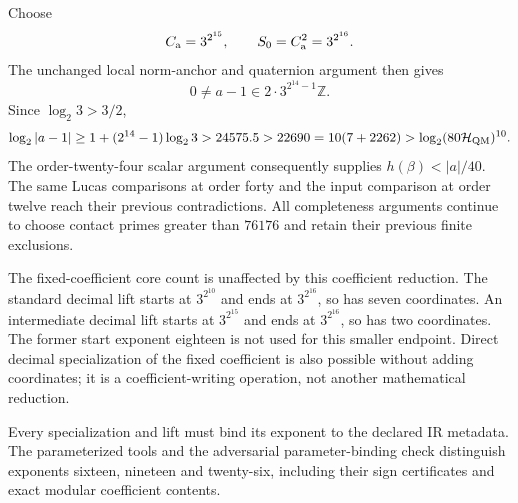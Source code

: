 Choose
\[
 C_{\rm a}=3^{2^{15}},\qquad S_0=C_{\rm a}^2=3^{2^{16}}.
\]
The unchanged local norm-anchor and quaternion argument then gives
\[
 0\ne a-1\in2\cdot3^{2^{14}-1}\mathbb Z.
\]
Since $\log_2 3>3/2$,
\[
 \log_2|a-1|\ge1+(2^{14}-1)\log_2 3
 >24575.5>22690=10(7+2262)
 >\log_2(80\mathcal H_{\rm QM})^{10}.
\]
The order-twenty-four scalar argument consequently supplies
$h(\beta)<|a|/40$. The same Lucas comparisons at order forty and the
input comparison at order twelve reach their previous contradictions.
All completeness arguments continue to choose contact primes greater
than $76176$ and retain their previous finite exclusions.

The fixed-coefficient core count is unaffected by this coefficient
reduction. The standard decimal lift starts at $3^{2^{10}}$ and ends
at $3^{2^{16}}$, so has seven coordinates. An intermediate decimal
lift starts at $3^{2^{15}}$ and ends at $3^{2^{16}}$, so has two
coordinates. The former start exponent eighteen is not used for this
smaller endpoint. Direct decimal specialization of the fixed coefficient
is also possible without adding coordinates; it is a coefficient-writing
operation, not another mathematical reduction.

Every specialization and lift must bind its exponent to the declared IR
metadata. The parameterized tools and the adversarial parameter-binding
check distinguish exponents sixteen, nineteen and twenty-six, including
their sign certificates and exact modular coefficient contents.
